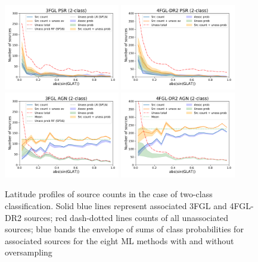 \documentclass[referee]{aa} %
\begin{document}
\begin{figure}[h]
\centering
\includegraphics[width=0.45\textwidth]{plots/lat_profile_PSR_3FGL_2classes.pdf}
\includegraphics[width=0.45\textwidth]{plots/lat_profile_PSR_4FGL-DR2_2classes.pdf} \\
\includegraphics[width=0.45\textwidth]{plots/lat_profile_AGN_3FGL_2classes.pdf}
\includegraphics[width=0.45\textwidth]{plots/lat_profile_AGN_4FGL-DR2_2classes.pdf}
\caption{Latitude profiles of source counts in the case of two-class classification. 
Solid blue lines represent associated 3FGL and 4FGL-DR2  sources; red dash-dotted lines counts of all unassociated sources; blue bands the envelope of sums of class probabilities for associated sources for the eight ML methods with and without oversampling
}
\end{figure}
\end{document}
